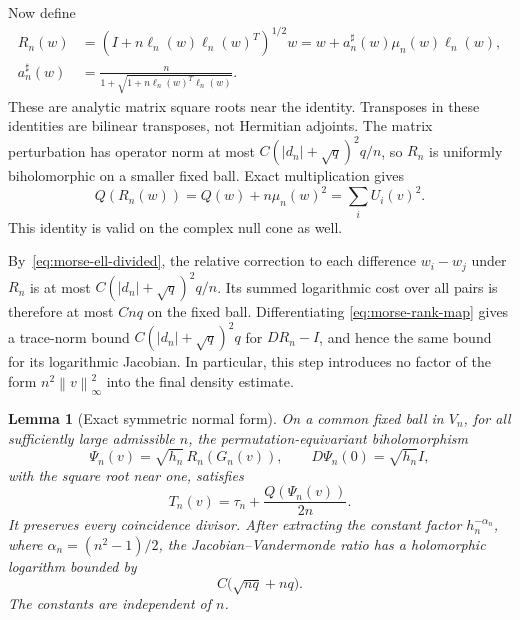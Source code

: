 \documentclass[11pt]{article}
\numberwithin{equation}{section}
\newtheorem{lemma}[theorem]{Lemma}
\theoremstyle{definition}
\newcommand{\norm}[1]{\left\lVert#1\right\rVert}
\begin{document}
Now define
\begin{align}
 R_n(w)&=\left(I+n\ell_n(w)\ell_n(w)^T\right)^{1/2}w
        =w+a_n^\sharp(w)\mu_n(w)\ell_n(w),\label{eq:morse-rank-map}\\
 a_n^\sharp(w)&=\frac n{1+\sqrt{1+n\ell_n(w)^T\ell_n(w)}}.
 \label{eq:morse-rank-coefficient}
\end{align}
These are analytic matrix square roots near the identity.  Transposes in
these identities are bilinear transposes, not Hermitian adjoints.  The
matrix perturbation has operator norm at most
$C(|d_n|+\sqrt q)^2q/n$, so $R_n$ is uniformly biholomorphic on a
smaller fixed ball.  Exact multiplication gives
\begin{equation}
 Q(R_n(w))=Q(w)+n\mu_n(w)^2=\sum_iU_i(v)^2.
 \label{eq:morse-rank-energy}
\end{equation}
This identity is valid on the complex null cone as well.

By~\eqref{eq:morse-ell-divided}, the relative correction to each
difference $w_i-w_j$ under $R_n$ is at most
$C(|d_n|+\sqrt q)^2q/n$.  Its summed logarithmic cost over all pairs
is therefore at most $Cnq$ on the fixed ball.  Differentiating
\eqref{eq:morse-rank-map} gives a trace-norm bound
$C(|d_n|+\sqrt q)^2q$ for $DR_n-I$, and hence the same bound for its
logarithmic Jacobian.  In particular, this step introduces no factor
of the form $n^2\norm v_\infty^2$ into the final density estimate.

\begin{lemma}[Exact symmetric normal form]
\label{lem:negative-morse}
On a common fixed ball in $V_n$, for all sufficiently large admissible
$n$, the permutation-equivariant biholomorphism
\begin{equation}
 \Psi_n(v)=\sqrt{h_n}\,R_n(G_n(v)),
 \qquad D\Psi_n(0)=\sqrt{h_n}I,
 \label{eq:morse-final-map}
\end{equation}
with the square root near one, satisfies
\begin{equation}
 \boxed{T_n(v)=\tau_n+\frac{Q(\Psi_n(v))}{2n}.}
 \label{eq:morse-exact-normal-form}
\end{equation}
It preserves every coincidence divisor.  After extracting the constant
factor $h_n^{-\alpha_n}$, where $\alpha_n=(n^2-1)/2$, the
Jacobian--Vandermonde ratio has a holomorphic logarithm bounded by
\begin{equation}
 C\bigl(\sqrt{nq}+nq\bigr).
 \label{eq:morse-geometric-density}
\end{equation}
The constants are independent of $n$.
\end{lemma}
\end{document}
